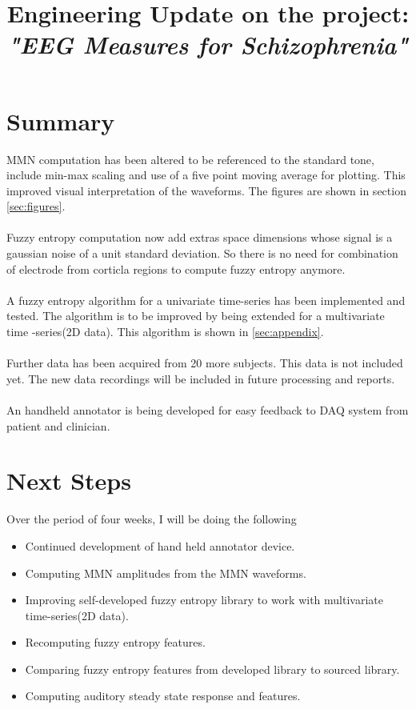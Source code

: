 \documentclass[10pt]{article}
\title{Engineering Update on the project: \textit{\textbf{"EEG Measures for Schizophrenia"}}}
\begin{document}
\maketitle

\section{Summary}
MMN computation has been altered to be referenced to the standard tone, include min-max scaling and use of a five point moving average for plotting.
This improved visual interpretation of the waveforms. The figures are shown in section \ref{sec:figures}.\\
\\
Fuzzy entropy computation now add extras space dimensions whose signal is a gaussian noise of a unit standard deviation.
So there is no need for combination of electrode from corticla regions to compute fuzzy entropy anymore.\\
\\
A fuzzy entropy algorithm for a univariate time-series has been implemented and tested. The algorithm 
is to be improved by being extended for a multivariate time -series(2D data). This algorithm is shown in \ref{sec:appendix}.\\
\\
Further data has been acquired from 20 more subjects. This data is not included yet. The new data recordings will be included 
in future processing and reports.\\
\\
An handheld annotator is being developed for easy feedback to DAQ system from patient and  
clinician.

\section{Next Steps}
Over the period of four weeks, I will be doing the following
\begin{itemize}
  \item Continued development of hand held annotator device.
  \item Computing MMN amplitudes from the MMN waveforms.
  \item Improving self-developed fuzzy entropy library to work with multivariate
  time-series(2D data).
  \item Recomputing fuzzy entropy features.
  \item Comparing fuzzy entropy features from developed library to sourced library.
  \item Computing auditory steady state response and features.
\end{itemize}
            
\end{document}
